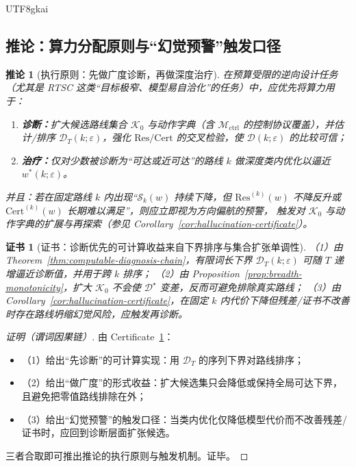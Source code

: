 \documentclass[12pt]{article}
\newtheorem{corollary}{推论}[section]
\newtheorem{certificate}{证书}[section]
\newcommand{\RTSC}{\textsf{RTSC}}
\begin{document}
\begin{CJK*}{UTF8}{gkai}
\subsection{推论：算力分配原则与“幻觉预警”触发口径}

\begin{corollary}[执行原则：先做广度诊断，再做深度治疗]
\label{cor:diagnosis-before-treatment}
在预算受限的逆向设计任务（尤其是 \RTSC{} 这类“目标极窄、模型易自洽化”的任务）中，应优先将算力用于：
\begin{enumerate}
  \item \textbf{诊断：}扩大候选路线集合 $\mathcal{K}_0$ 与动作字典（含 $\mathcal{M}_{\mathrm{ctrl}}$ 的控制协议覆盖），并估计/排序 $\mathcal{D}_T(k;
    \varepsilon)$，强化 $\mathrm{Res}/\mathrm{Cert}$ 的交叉检验，使 $\mathcal{D}(k;\varepsilon)$ 的比较可信；
  \item \textbf{治疗：}仅对少数被诊断为“可达或近可达”的路线 $k$ 做深度类内优化以逼近 $w^\ast(k;\varepsilon)$。
\end{enumerate}
并且：若在固定路线 $k$ 内出现“$\mathcal{S}_k(w)$ 持续下降，但 $\mathrm{Res}^{(k)}(w)$ 不降反升或 $\mathrm{Cert}^{(k)}(w)$ 长期难以满足”，则应立即视为方向偏航的预警，
  触发对 $\mathcal{K}_0$ 与动作字典的扩展与再探索（参见 Corollary~\ref{cor:hallucination-certificate}）。
\end{corollary}

\begin{certificate}[证书：诊断优先的可计算收益来自下界排序与集合扩张单调性]
\label{cert:diagnosis-before-treatment}
（1）由 Theorem~\ref{thm:computable-diagnosis-chain}，有限词长下界 $\mathcal{D}_T(k;\varepsilon)$ 可随 $T$ 递增逼近诊断值，并用于跨 $k$ 排序；
（2）由 Proposition~\ref{prop:breadth-monotonicity}，扩大 $\mathcal{K}_0$ 不会使 $\mathcal{D}^\star$ 变差，反而可避免排除真实路线；
（3）由 Corollary~\ref{cor:hallucination-certificate}，在固定 $k$ 内代价下降但残差/证书不改善时存在路线坍缩幻觉风险，应触发再诊断。
\end{certificate}

\begin{proof}[证明（谓词因果链）]
由 Certificate~\ref{cert:diagnosis-before-treatment}：
\begin{itemize}
  \item（1）给出“先诊断”的可计算实现：用 $\mathcal{D}_T$ 的序列下界对路线排序；
  \item（2）给出“做广度”的形式收益：扩大候选集只会降低或保持全局可达下界，且避免把零值路线排除在外；
  \item（3）给出“幻觉预警”的触发口径：当类内优化仅降低模型代价而不改善残差/证书时，应回到诊断层面扩张候选。
\end{itemize}
三者合取即可推出推论的执行原则与触发机制。证毕。
\end{proof}


\end{CJK*}
\end{document}
